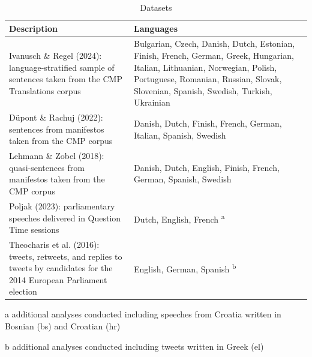 \begin{table}[!t]

\begin{threeparttable}
\caption{\label{tab:datasets_overview}Datasets}
\centering
\fontsize{10}{12}\selectfont
\begin{tabular}[t]{>{\raggedright\arraybackslash}L{2.8in}>{\raggedright\arraybackslash}L{2.3in}}
\toprule
\headrow Description & Languages\\
\midrule
Ivanusch \& Regel (2024): language-stratified sample of sentences taken from the CMP Translations corpus & Bulgarian, Czech, Danish, Dutch, Estonian, Finish, French, German, Greek, Hungarian, Italian, Lithuanian, Norwegian, Polish, Portuguese, Romanian, Russian, Slovak, Slovenian, Spanish, Swedish, Turkish, Ukrainian\\
Düpont \& Rachuj (2022): sentences from manifestos taken from the CMP corpus & Danish, Dutch, Finish, French, German, Italian, Spanish, Swedish\\
Lehmann \& Zobel (2018): quasi-sentences from manifestos taken from the CMP corpus & Danish, Dutch, English, Finish, French, German, Spanish, Swedish\\
Poljak (2023): parliamentary speeches delivered in Question Time sessions & Dutch, English, French \textsuperscript{a}\\
Theocharis et al. (2016): tweets, retweets, and replies to tweets by candidates for the 2014 European Parliament election & English, German, Spanish \textsuperscript{b}\\
\bottomrule
\end{tabular}
\begin{tablenotes}
\small
\item [a] additional analyses conducted including speeches from Croatia written in Bosnian (bs) and Croatian (hr)
\item [b] additional analyses conducted including tweets written in Greek (el)
\end{tablenotes}
\end{threeparttable}
\end{table}
